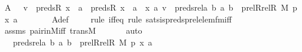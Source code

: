\begin{isabellebody}
\ {\isachardoublequoteopen}A\ {\isacharequal}{\kern0pt}\ {\isacharbraceleft}{\kern0pt}\ v\ {\isasymin}\ {\isacharparenleft}{\kern0pt}preds{\isacharparenleft}{\kern0pt}R{\isacharcomma}{\kern0pt}\ x{\isacharparenright}{\kern0pt}\ {\isasymtimes}\ {\isacharbraceleft}{\kern0pt}a{\isacharbraceright}{\kern0pt}{\isacharparenright}{\kern0pt}\ {\isasymtimes}\ {\isacharparenleft}{\kern0pt}{\isacharparenleft}{\kern0pt}preds{\isacharparenleft}{\kern0pt}R{\isacharcomma}{\kern0pt}\ x{\isacharparenright}{\kern0pt}\ {\isasymtimes}\ {\isacharbraceleft}{\kern0pt}a{\isacharbraceright}{\kern0pt}{\isacharparenright}{\kern0pt}\ {\isasymunion}\ {\isacharbraceleft}{\kern0pt}{\isacharless}{\kern0pt}x{\isacharcomma}{\kern0pt}\ a{\isachargreater}{\kern0pt}{\isacharbraceright}{\kern0pt}{\isacharparenright}{\kern0pt}{\isachardot}{\kern0pt}\ v\ {\isasymin}\ preds{\isacharunderscore}{\kern0pt}rel{\isacharparenleft}{\kern0pt}{\isasymlambda}a\ b{\isachardot}{\kern0pt}\ {\isacharless}{\kern0pt}a{\isacharcomma}{\kern0pt}\ b{\isachargreater}{\kern0pt}\ {\isasymin}\ prel{\isacharparenleft}{\kern0pt}Rrel{\isacharparenleft}{\kern0pt}R{\isacharcomma}{\kern0pt}\ M{\isacharparenright}{\kern0pt}{\isacharcomma}{\kern0pt}\ p{\isacharparenright}{\kern0pt}{\isacharcomma}{\kern0pt}\ {\isacharless}{\kern0pt}x{\isacharcomma}{\kern0pt}\ a{\isachargreater}{\kern0pt}{\isacharparenright}{\kern0pt}\ {\isacharbraceright}{\kern0pt}{\isachardoublequoteclose}\ \isanewline
\ \ \ \ \isamarkupfalse%
\ A{\isacharunderscore}{\kern0pt}def\isanewline
\ \ \ \ \isamarkupfalse%
{\isacharparenleft}{\kern0pt}rule\ iff{\isacharunderscore}{\kern0pt}eq{\isacharcomma}{\kern0pt}\ rule\ sats{\isacharunderscore}{\kern0pt}is{\isacharunderscore}{\kern0pt}preds{\isacharunderscore}{\kern0pt}prel{\isacharunderscore}{\kern0pt}elem{\isacharunderscore}{\kern0pt}fm{\isacharunderscore}{\kern0pt}iff{\isacharparenright}{\kern0pt}\isanewline
\ \ \ \ \isamarkupfalse%
\ assms\ pair{\isacharunderscore}{\kern0pt}in{\isacharunderscore}{\kern0pt}M{\isacharunderscore}{\kern0pt}iff\ transM\ \isanewline
\ \ \ \ \isamarkupfalse%
\ auto\isanewline
\isanewline
\ \ \isamarkupfalse%
\ \isamarkupfalse%
\ {\isachardoublequoteopen}{\isachardot}{\kern0pt}{\isachardot}{\kern0pt}{\isachardot}{\kern0pt}\ {\isacharequal}{\kern0pt}\ preds{\isacharunderscore}{\kern0pt}rel{\isacharparenleft}{\kern0pt}{\isasymlambda}a\ b{\isachardot}{\kern0pt}\ {\isacharless}{\kern0pt}a{\isacharcomma}{\kern0pt}\ b{\isachargreater}{\kern0pt}\ {\isasymin}\ prel{\isacharparenleft}{\kern0pt}Rrel{\isacharparenleft}{\kern0pt}R{\isacharcomma}{\kern0pt}\ M{\isacharparenright}{\kern0pt}{\isacharcomma}{\kern0pt}\ p{\isacharparenright}{\kern0pt}{\isacharcomma}{\kern0pt}\ {\isacharless}{\kern0pt}x{\isacharcomma}{\kern0pt}\ a{\isachargreater}{\kern0pt}{\isacharparenright}{\kern0pt}{\isachardoublequoteclose}\ \isanewline

\end{isabellebody}
